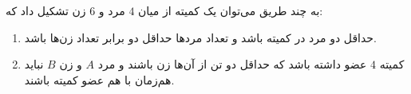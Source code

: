 \EXERCISE
به چند طریق می‌توان یک کمیته از میان
$4$
مرد و
$6$
زن تشکیل داد که:
\begin{enumerate}
\item
حداقل دو مرد در کمیته باشد و تعداد مردها حداقل دو برابر تعداد زن‌ها باشد.
\item
کمیته
$4$
عضو داشته باشد که حداقل دو تن از آن‌ها زن باشند و مرد
$A$
و زن
$B$
نباید هم‌زمان با هم عضو کمیته باشند.
\end{enumerate}